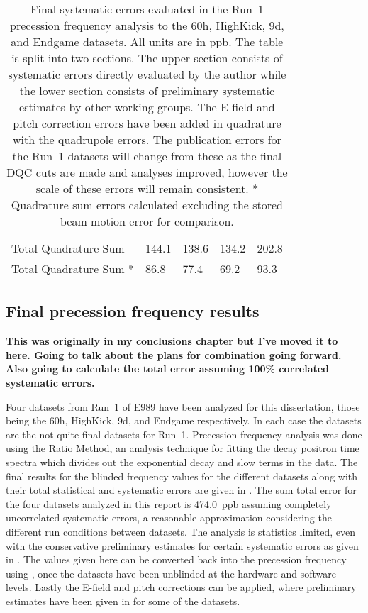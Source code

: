 \begin{table}
\begin{tabular*}{\linewidth}{@{\extracolsep{\fill}}lGGGG}
  \hline\hline
    Total Quadrature Sum & 144.1 & 138.6 & 134.2 & 202.8 \\
    Total Quadrature Sum * & 86.8 & 77.4 & 69.2 & 93.3 \\
  \hline
\end{tabular*}
\caption[Systematic errors evaluated in the Run~1 precession frequency datasets]{Final systematic errors evaluated in the Run~1 precession frequency analysis to the 60h, HighKick, 9d, and Endgame datasets. All units are in ppb. The table is split into two sections. The upper section consists of systematic errors directly evaluated by the author while the lower section consists of preliminary systematic estimates by other working groups. The E-field and pitch correction errors have been added in quadrature with the quadrupole errors. The publication errors for the Run~1 datasets will change from these as the final DQC cuts are made and analyses improved, however the scale of these errors will remain consistent. * Quadrature sum errors calculated excluding the stored beam motion error for comparison.}
\label{tab:FinalSystematicErrors}
\end{table}




\subsection{Final precession frequency results}


\textbf{This was originally in my conclusions chapter but I've moved it to here. Going to talk about the plans for combination going forward. Also going to calculate the total error assuming 100\% correlated systematic errors.}



Four datasets from Run~1 of E989 have been analyzed for this dissertation, those being the 60h, HighKick, 9d, and Endgame respectively. In each case the datasets are the not-quite-final datasets for Run~1. Precession frequency analysis was done using the Ratio Method, an analysis technique for fitting the decay positron time spectra which divides out the exponential decay and slow terms in the data. The final results for the blinded frequency \R values for the different datasets along with their total statistical and systematic errors are given in . The sum total error for the four datasets analyzed in this report is \SI{474.0}{ppb} assuming completely uncorrelated systematic errors, a reasonable approximation considering the different run conditions between datasets. The analysis is statistics limited, even with the conservative preliminary estimates for certain systematic errors as given in . The \R values given here can be converted back into the precession frequency \wa using , once the datasets have been unblinded at the hardware and software levels. Lastly the E-field and pitch corrections can be applied, where preliminary estimates have been given in  for some of the datasets. 



